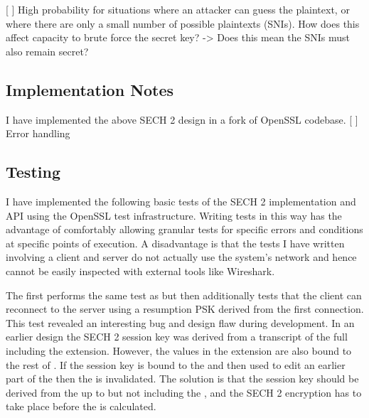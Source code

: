 [ ] High probability for situations where an attacker can guess the plaintext, or where there are only a small number of possible plaintexts (SNIs). How does this affect capacity to brute force the secret key? -> Does this mean the SNIs must also remain secret?

\subsection{Implementation Notes}
I have implemented the above \ac{SECH} 2 design in a fork of OpenSSL codebase.
[ ] Error handling
\subsection{Testing}

I have implemented the following basic tests of the \ac{SECH} 2 implementation and \ac{API} using the OpenSSL test infrastructure. Writing tests in this way has the advantage of comfortably allowing granular tests for specific errors and conditions at specific points of execution. A disadvantage is that the tests I have written involving a client and server do not actually use the system's network and hence cannot be easily inspected with external tools like Wireshark.

The  first performs the same test as  but then additionally tests that the client can reconnect to the server using a resumption \ac{PSK} derived from the first connection. This test revealed an interesting bug and design flaw during development. In an earlier design the \ac{SECH} 2 session key was derived from a transcript of the full  including the  extension. However, the  values in the  extension are also bound to the rest of . If the session key is bound to the  and then used to edit an earlier part of the  then the  is invalidated. The solution is that the session key should be derived from the  up to but not including the , and the \ac{SECH} 2 encryption has to take place before the  is calculated.